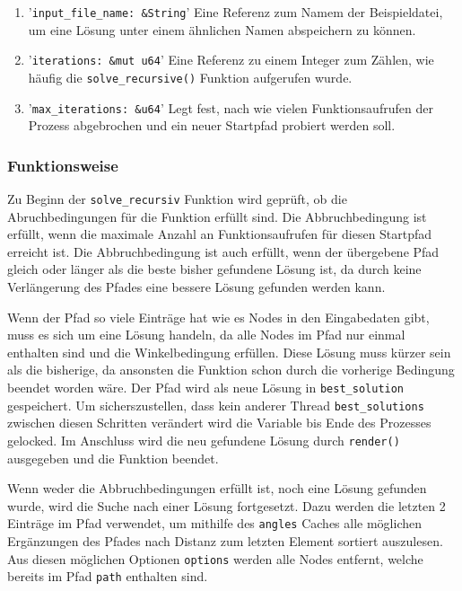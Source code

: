 \documentclass[a4paper,10pt,ngerman]{scrartcl}
\begin{document}
\begin{enumerate}
    \item '\lstinline{input_file_name: &String}' Eine Referenz zum Namem der Beispieldatei, um eine Lösung unter einem ähnlichen Namen abspeichern zu können.
    \item '\lstinline{iterations: &mut u64}' Eine Referenz zu einem Integer zum Zählen, wie häufig die \lstinline{solve_recursive()} Funktion aufgerufen wurde.
    \item '\lstinline{max_iterations: &u64}' Legt fest, nach wie vielen Funktionsaufrufen der Prozess abgebrochen und ein neuer Startpfad probiert werden soll.  
\end{enumerate}
\subsubsection{Funktionsweise}
Zu Beginn der \lstinline{solve_recursiv} Funktion wird geprüft, ob die Abruchbedingungen für die Funktion erfüllt sind. Die Abbruchbedingung ist erfüllt, wenn die maximale Anzahl an Funktionsaufrufen für diesen Startpfad erreicht ist. Die Abbruchbedingung ist auch erfüllt, wenn der übergebene Pfad gleich oder länger als die beste bisher gefundene Lösung ist, da durch keine Verlängerung des Pfades eine bessere Lösung gefunden werden kann. 

Wenn der Pfad so viele Einträge hat wie es Nodes in den Eingabedaten gibt, muss es sich um eine Lösung handeln, da alle Nodes im Pfad nur einmal enthalten sind und die Winkelbedingung erfüllen. Diese Lösung muss kürzer sein als die bisherige, da ansonsten die Funktion schon durch die vorherige Bedingung beendet worden wäre. Der Pfad wird als neue Lösung in \lstinline{best_solution} gespeichert. Um sicherszustellen, dass kein anderer Thread \lstinline{best_solutions} zwischen diesen Schritten verändert wird die Variable bis Ende des Prozesses gelocked. Im Anschluss wird die neu gefundene Lösung durch \lstinline{render()} ausgegeben und die Funktion beendet. 

Wenn weder die Abbruchbedingungen erfüllt ist, noch eine Lösung gefunden wurde, wird die Suche nach einer Lösung fortgesetzt. Dazu werden die letzten 2 Einträge im Pfad verwendet, um mithilfe des \lstinline{angles} Caches alle möglichen Ergänzungen des Pfades nach Distanz zum letzten Element sortiert auszulesen. Aus diesen möglichen Optionen \lstinline{options} werden alle Nodes entfernt, welche bereits im Pfad \lstinline{path} enthalten sind.
\end{document}
